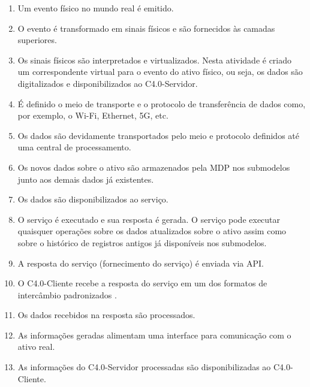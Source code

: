 \begin{enumerate}

	\item Um evento físico no mundo real é emitido.

	\item O evento é transformado em sinais físicos e são fornecidos às camadas superiores.

	\item Os sinais físicos são interpretados e virtualizados. Nesta atividade é criado um correspondente virtual para o evento do ativo físico, ou seja, os dados são digitalizados e disponibilizados ao C4.0-Servidor.

	\item É definido o meio de transporte e o protocolo de transferência de dados como, por exemplo, o Wi-Fi, Ethernet, 5G, etc.

	\item Os dados são devidamente transportados pelo meio e protocolo definidos até uma central de processamento.

	\item Os novos dados sobre o ativo são armazenados pela MDP nos submodelos junto aos demais dados já existentes.

	\item Os dados são disponibilizados ao serviço.

	\item O serviço é executado e sua resposta é gerada. O serviço pode executar quaisquer operações sobre os dados atualizados sobre o ativo assim como sobre o histórico de registros antigos já disponíveis nos submodelos.

	\item A resposta do serviço (fornecimento do serviço) é enviada via API.

	\item O C4.0-Cliente recebe a resposta do serviço em um dos formatos de intercâmbio padronizados \cite{bader2019aas}.

	\item Os dados recebidos na resposta são processados.

	\item As informações geradas alimentam uma interface para comunicação com o ativo real.

	\item As informações do C4.0-Servidor processadas são disponibilizadas ao C4.0-Cliente.
\end{enumerate}

